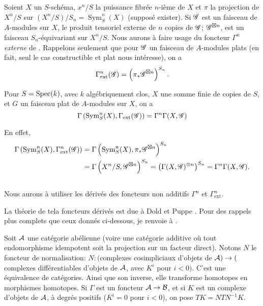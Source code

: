\documentclass[oneside]{book}
\begin{document}
Soient $X$ un $S$-sch\'ema, $x^n/S$ la puissance fibr\'ee $n$-i\`eme de $X$ et 
$\pi$ la projection de $X^n/S$ sur $(X^n/S)/S_n=\operatorname{Sym}_S^n(X)$ 
(suppos\'e exister). Si $\mathscr{G}$ est un faisceau de $A$-modules sur $X$, le 
produit tensoriel externe de $n$ copies de $\mathscr{G}$; $\mathscr{G}^{\boxtimes n}$, est un 
faisceau $S_n$-\'equivariant sur $X^n/S$. Nous aurons \`a faire usage du 
foncteur $\Gamma^n$ \emph{externe} de \cite[XVII 5.5.7 \`a 9]{4}. Rappelons 
seulement que pour $\mathscr{G}$ un faisceau de $A$-modules plats (en fait, seul le cas 
constructible et plat nous int\'eresse), on a 
\[
  \Gamma_\text{ext}^n(\mathscr{G}) = \left(\pi_*\mathscr{G}^{\boxtimes n}\right)^{S_n} \text{.}
\]





\begin{lemma_}\label{III:1-3}
Pour $S=\operatorname{Spec}(k)$, avec $k$ alg\'ebriquement clos, $X$ une somme finie de 
copies de $S$, et $G$ un faisceau plat de $A$-modules sur $X$, on a 
\[
  \Gamma\left(\operatorname{Sym}_S^n(X),\Gamma_\text{ext}(\mathscr{G})\right) = \Gamma^n \Gamma(X,\mathscr{G})
\]
\end{lemma_}

En effet, 
\begin{align*}
  \Gamma\left(\operatorname{Sym}_S^n(X),\Gamma_\text{ext}^n(\mathscr{G})\right) 
    &= \Gamma\left(\operatorname{Sym}_S^n(X),\pi_*\mathscr{G}^{\boxtimes n}\right)^{S_n} \\
    &= \Gamma\left(X^n/S,\mathscr{G}^{\boxtimes n}\right)^{S_n} 
    = \left(\Gamma(X,\mathscr{G})^{\otimes n}\right)^{S_n} 
    = \Gamma^n \Gamma(X,\mathscr{G}) \text{.}
\end{align*}





\subsection{}\label{III:1-4}

Nous aurons \`a utiliser les d\'eriv\'es des foncteurs non additifs $\Gamma^n$ 
et $\Gamma_\text{ext}^n$. 

La th\'eorie de tela foncteurs d\'eriv\'es est due \`a Dold et Puppe 
\cite{III:DP}. Pour des rappels plus complets que ceux donn\'es ci-dessous, je 
renvoie \`a \cite[XVII 5.5.3]{4}. 

Soit $\mathcal{A}$ une cat\'egorie ab\'elienne (voire une cat\'egorie additive o\`u 
tout endomorphisme idempotent soit la projection sur un facteur direct). Notons 
$N$ le foncteur de normalisation: $N:($complexes cosimpliciaux d'objets de 
$\mathcal{A})\to($complexes différentiables d'objets de $\mathcal{A}$, avec $K^i$ pour 
$i<0)$. C'est une \'equivalence de cat\'egories. Ainsi que son inverse, elle 
transforme homotopes en morphismes homotopes. Si $\Gamma$ est un foncteur 
$\mathcal{A}\to\mathcal{B}$, et si $K$ est un complexe d'objets de $\mathcal{A}$, \`a degr\'es 
positifs ($K^i=0$ pour $i<0$), on pose $T K=N T N^{-1} K$. 
\end{document}
